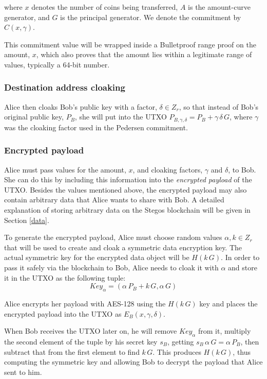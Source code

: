 \documentclass[a4paper, 10pt, conference]{ieeeconf}
\begin{document}
where $x$ denotes the number of coins being transferred, $A$ is the amount-curve generator, and $G$ is the principal generator. We denote the commitment by $C(x, \gamma)$. 

This commitment value will be wrapped inside a Bulletproof range proof on the amount, $x$, which also proves that the amount lies within a legitimate range of values, typically a 64-bit number.

\subsubsection{Destination address cloaking} Alice then cloaks Bob's public key with a factor, $\delta \in Z_r$, so that instead of Bob's original public key, $P_B$, she will put into the UTXO $P_{B, \gamma, \delta} = P_B + \gamma \, \delta \, G$, where $\gamma$ was the cloaking factor used in the Pedersen commitment.


\subsubsection{Encrypted payload} Alice must pass values for the amount, $x$, and cloaking factors, $\gamma$ and $\delta$, to Bob. She can do this by including this information into the \textit{encrypted payload} of the UTXO. Besides the values mentioned above, the encrypted payload may also contain arbitrary data that Alice wants to share with Bob. A detailed explanation of storing arbitrary data on the Stegos blockchain will be given in Section \ref{data}. 

To generate the encrypted payload, Alice must choose random values $\alpha, k \in Z_r$ that will be used to create and cloak a symmetric data encryption key. The actual symmetric key for the encrypted data object will be $H(k \, G)$. In order to pass it safely via the blockchain to Bob, Alice needs to cloak it with $\alpha$ and store it in the UTXO as the following tuple: $$\mathit{Key}_{\alpha} = (\alpha \, P_{B} + k \, G, \alpha \, G )$$ 

Alice encrypts her payload with AES-128 using the $H(k \, G)$ key and places the encrypted payload into the UTXO as $E_B(x, \gamma, \delta)$.

When Bob receives the UTXO later on, he will remove $\mathit{Key}_{\alpha}$ from it, multiply the second element of the tuple by his secret key $s_B$, getting $s_B \, \alpha \, G = \alpha \, P_B$, then subtract that from the first element to find $k \, G$. This produces $H(k \, G)$, thus computing the symmetric key and allowing Bob to decrypt the payload that Alice sent to him.
\end{document}
